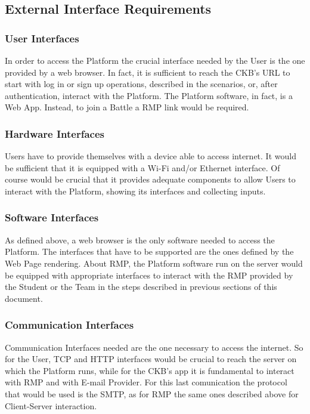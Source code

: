 \subsection{External Interface Requirements}

\subsubsection{User Interfaces}
In order to access the Platform the crucial interface needed by the User is the one provided by a web browser. In fact, it is sufficient to reach the CKB's URL to start with log in or sign up operations, described in the scenarios, or, 
after authentication, interact with the Platform. The Platform software, in fact, is a Web App. Instead, to join a Battle a RMP link would be required.

\subsubsection{Hardware Interfaces}
Users have to provide themselves with a device able to access internet. It would be sufficient that it is equipped with a Wi-Fi and/or Ethernet interface. Of course would be crucial that it provides adequate components to allow Users 
to interact with the Platform, showing its interfaces and collecting inputs.

\subsubsection{Software Interfaces}
As defined above, a web browser is the only software needed to access the Platform. The interfaces that have to be supported are the ones defined by the Web Page rendering. About RMP, the Platform software run on the server would be 
equipped with appropriate interfaces to interact with the RMP provided by the Student or the Team in the steps described in previous sections of this document.
\subsubsection{Communication Interfaces}
Communication Interfaces needed are the one necessary to access the internet. So for the User, TCP and HTTP interfaces would be crucial to reach the server on which the Platform runs, while for the CKB's app it is fundamental to 
interact with RMP and with E-mail Provider. For this last comunication the protocol that would be used is the SMTP, as for RMP the same ones described above for Client-Server interaction.


